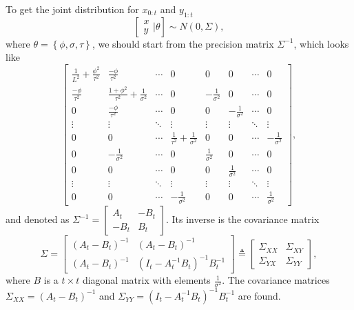 To get the joint distribution for $x_{0:t}$ and $y_{1:t}$
\begin{equation*}
\left[ \begin{matrix} x\\y  \end{matrix}\bigg\rvert \theta \right]
\sim N\left(0, \Sigma  \right),
\end{equation*}
where $\theta = \left\lbrace \phi,\sigma,\tau\right\rbrace$, we should start from the precision matrix $\Sigma^{-1}$, which looks like 
\begin{equation*}
\begin{bmatrix}
\frac{1}{L^2}+\frac{\phi^2}{\tau^2} & \frac{-\phi}{\tau^2} & \cdots & 0 & 0 & 0& \cdots & 0\\
\frac{-\phi}{\tau^2}   & \frac{1+\phi^2}{\tau^2}+\frac{1}{\sigma^2}& \cdots & 0 & -\frac{1}{\sigma^2} &0 & \cdots & 0 \\
0 & \frac{-\phi}{\tau^2}   &  \cdots & 0 & 0& -\frac{1}{\sigma^2} & \cdots & 0\\
\vdots & \vdots & \ddots & \vdots & \vdots & \vdots & \ddots & \vdots \\
0 & 0   &  \cdots & \frac{1}{\tau^2}+\frac{1}{\sigma^2} & 0 & 0 & \cdots &-\frac{1}{\sigma^2}\\
0 & -\frac{1}{\sigma^2}  & \cdots & 0 & \frac{1}{\sigma^2} & 0 & \cdots & 0 \\
0& 0 & \cdots & 0 & 0 &  \frac{1}{\sigma^2} & \cdots & 0\\
\vdots & \vdots & \ddots & \vdots & \vdots & \vdots & \ddots & \vdots\\
0 & 0& \cdots &-\frac{1}{\sigma^2} & 0 & 0 & \cdots &  \frac{1}{\sigma^2}
\end{bmatrix},
\end{equation*}
and denoted as $\Sigma^{-1}=\begin{bmatrix} A_t & -B_t \\ -B_t & B_t \end{bmatrix}$. Its inverse is the covariance matrix 
\begin{equation}
\Sigma=\begin{bmatrix} (A_t-B_t)^{-1} &  (A_t-B_t)^{-1} \\ (A_t-B_t)^{-1} & (I_{t}-A_t^{-1}B_t)^{-1}B_t^{-1} \end{bmatrix} \triangleq \begin{bmatrix}
\Sigma_{XX} & \Sigma_{XY}  \\ \Sigma_{YX} & \Sigma_{YY} 
\end{bmatrix},
\end{equation}
where $B$ is a $t\times t$ diagonal matrix with elements $\frac{1}{\sigma^2}$. The covariance matrices $\Sigma_{XX} =  \left(A_t-B_t\right)^{-1}$ and $\Sigma_{YY}=\left(I_{t}-A_t^{-1}B_t\right)^{-1}B_t^{-1}$ are found. 



